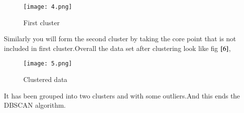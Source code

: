 \documentclass[journal,12pt,onecolumn]{IEEEtran}
\theoremstyle{remark}
\numberwithin{equation}{section}
\begin{document}
	   \begin{figure}[ht!]
            \centering
	    \texttt{[image: 4.png]}
	    \caption{First cluster}
	    \label{5}
	   \end{figure}
	Similarly you will form the second cluster by taking the core point that is not included in first cluster.Overall the data set after clustering look like fig $\ref{6}$,
	   \begin{figure}[ht!]
	    \centering
	    \texttt{[image: 5.png]}
	    \caption{Clustered data}
	    \label{6}
	   \end{figure}
  It has been grouped into two clusters and with some outliers.And this ends the DBSCAN algorithm.
    
\end{document}

